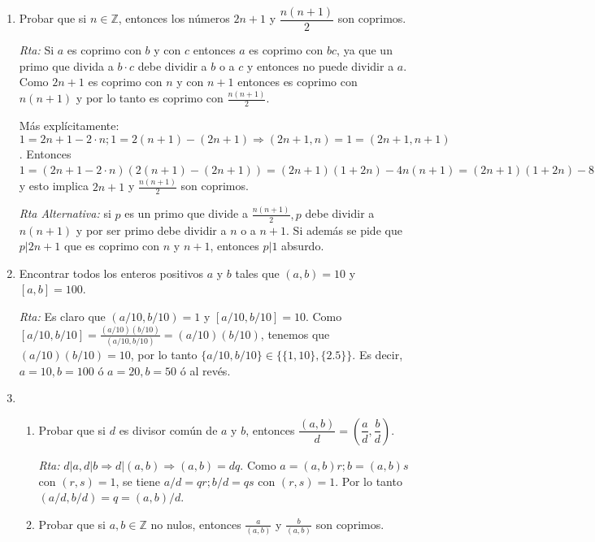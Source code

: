 \documentclass[12pt,spanish,makeidx]{amsbook}
\newcommand{\rta}{\noindent\textit{Rta: }}
\begin{document}
\begin{enumerate}
\begin{enumerate}
\end{enumerate}



\smallskip

\item Probar que si $n \in {\mathbb Z}$, entonces los números $2n+1$ y $\dfrac{n(n+1)}{2}$ son coprimos.

\rta Si $a$ es coprimo con $b$ y con $c$ entonces $a$ es coprimo con $bc$, ya que un primo que divida a $b\cdot c$ debe dividir a $b$ o a $c$ y entonces no puede dividir a $a$. Como $2n+1$ es coprimo con $n$ y con $n+1$ entonces es coprimo con $n(n+1)$ y por lo tanto es coprimo con $\frac{n(n+1)}{2}$.

Más explícitamente: $1=2n+1-2\cdot n; 1=2(n+1)-(2n+1) \Rightarrow (2n+1,n)=1=(2n+1, n+1)$.
Entonces  $1=(2n+1-2\cdot n)(2(n+1)-(2n+1))=(2n+1)(1+2n)-4n(n+1)=(2n+1)(1+2n)-8\frac{n(n+1)}{2}$ y esto implica $2n+1$ y $\frac{n(n+1)}{2}$ son coprimos.

\noindent\textit{Rta Alternativa: } si $p$ es un primo que divide a $\frac{n(n+1)}{2}, p$ debe dividir a $n(n+1)$ y por ser primo debe dividir a $n$ o a $n+1$. Si además se pide que $p\vert 2n+1$ que es coprimo con $n$ y $n+1$, entonces $p\vert 1$ absurdo.

\smallskip


\item Encontrar todos los enteros positivos $a$ y $b$ tales que $(a,b)=10$ y $[a,b]=100$.

\rta Es claro que $(a/10,b/10)=1$ y $[a/10,b/10] = 10$. Como $[a/10,b/10] = \displaystyle\frac{(a/10)(b/10)}{(a/10,b/10)}= (a/10)(b/10)$,  tenemos que $(a/10)(b/10) = 10$, por lo tanto $\{a/10,b/10\}\in \{\{1,10\},\{2.5\}\}$. Es decir, $a=10, b=100$ ó $a=20, b=50$ ó al revés.




\smallskip
\item
\begin{enumerate}
	\item Probar que si $d$ es divisor común de $a$ y $b$, entonces $\dfrac{(a,b)}{d} = \left(\dfrac{a}{d}, \dfrac{b}{d}\right)$.
	
	 \rta  $d\vert a, d\vert b\Rightarrow d\vert(a,b)\Rightarrow (a,b)=dq$. Como $a=(a,b)r; b=(a, b)s$ con $(r, s)=1$, se tiene $a/d=qr; b/d=qs$ con $(r, s)=1$. Por lo tanto $(a/d, b/d)=q=(a,b)/d$.
	
	\item Probar que si $a,b\in \mathbb Z$ no nulos, entonces  $\displaystyle \frac a{(a,b)}$ y $\displaystyle \frac b{(a,b)}$ son coprimos.
	

\end{enumerate}
\end{enumerate}
\end{document}
